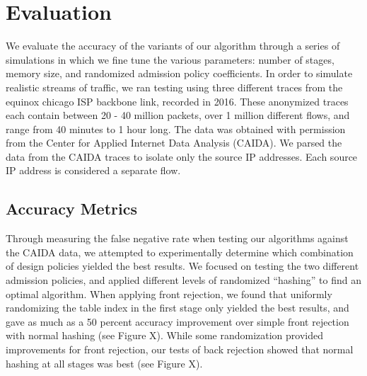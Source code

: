 \section{Evaluation}
\label{sec:eval}

We evaluate the accuracy of the variants of our algorithm through a series of simulations in which we fine tune the various parameters: number of stages, memory size, and randomized admission policy coefficients. In order to simulate realistic streams of traffic, we ran testing using three different traces from the equinox chicago ISP backbone link, recorded in 2016. These anonymized traces each contain between 20 - 40 million packets, over 1 million different flows, and range from 40 minutes to 1 hour long. The data was obtained with permission from the Center for Applied Internet Data Analysis (CAIDA). We parsed the data from the CAIDA traces to isolate only the source IP addresses. Each source IP address is considered a separate flow.

\subsection{Accuracy Metrics}
Through measuring the false negative rate when testing our algorithms against the CAIDA data, we attempted to experimentally determine which combination of design policies yielded the best results. We focused on testing the two different admission policies, and applied different levels of randomized ``hashing'' to find an optimal algorithm. When applying front rejection, we found that uniformly randomizing the table index in the first stage only yielded the best results, and gave as much as a 50 percent accuracy improvement over simple front rejection with normal hashing (see Figure X). While some randomization provided improvements for front rejection, our tests of back rejection showed that normal hashing at all stages was best (see Figure X).

